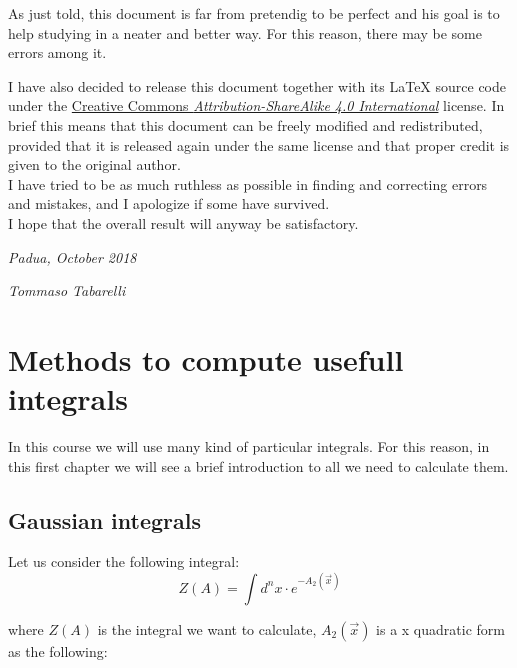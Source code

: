 \documentclass[12pt, english, a4paper]{book}
\begin{document}
As just told, this document is far from pretendig to be perfect and his goal is to help studying in a neater and better way. For this reason, there may be some errors among it.

I have also decided to release this document together with its \LaTeX{} source code under the \href{http://creativecommons.org/licenses/by-sa/4.0/}{\color{blue}Creative Commons \emph{Attribution-ShareAlike 4.0 International}} license. In brief this means that this document can be freely modified and redistributed, provided that it is released again under the same license and that proper credit is given to the original author.\\

I have tried to be as much ruthless as possible in finding and correcting errors and mistakes, and I apologize if some have survived.\\

I hope that the overall result will anyway be satisfactory.

\vspace{2em}

\hfill \emph{Padua, October 2018}

\hfill \emph{Tommaso Tabarelli}

\newpage
\thispagestyle{empty}
\let\cleardoublepage\clearpage

\tableofcontents
{}

\chapter{Methods to compute usefull integrals}

In this course we will use many kind of particular integrals. For this reason, in this first chapter we will see a brief introduction to all we need to calculate them.

\section{Gaussian integrals}

Let us consider the following integral:\\

\begin{equation}
Z(A) = \int d^{n}x \cdot e^{ -A_2(\vec{x}) }
\end{equation}

where $Z(A)$ is the integral we want to calculate, $A_2(\vec{x})$ is a x quadratic form as the following:
\end{document}
